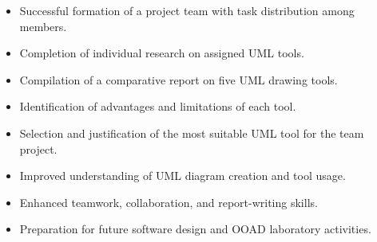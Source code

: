 \begin{itemize}
  \item Successful formation of a project team with task distribution among members.
  \item Completion of individual research on assigned UML tools.
  \item Compilation of a comparative report on five UML drawing tools.
  \item Identification of advantages and limitations of each tool.
  \item Selection and justification of the most suitable UML tool for the team project.
  \item Improved understanding of UML diagram creation and tool usage.
  \item Enhanced teamwork, collaboration, and report-writing skills.
  \item Preparation for future software design and OOAD laboratory activities.
\end{itemize}
